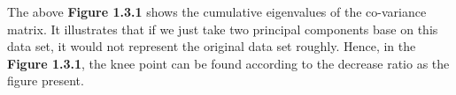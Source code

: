 \documentclass[titlepage,a4paper,12pt,thmsb]{report}
\begin{document}
\begin{center}
\begin{figure}[h]
{\par}
\end{figure}
{}
\end{center}

\begin{center}
\begin{figure}[h]
{\par}
\end{figure}
{}
\end{center}

\newpage

The above  {\bf{Figure 1.3.1}} shows the cumulative eigenvalues of the co-variance matrix. It illustrates that if we just take two principal components base on this data set, it would not represent the original data set  roughly. Hence, in the {\bf{Figure 1.3.1}}, the knee point can be found according to the decrease ratio as the figure present.
\end{document}
